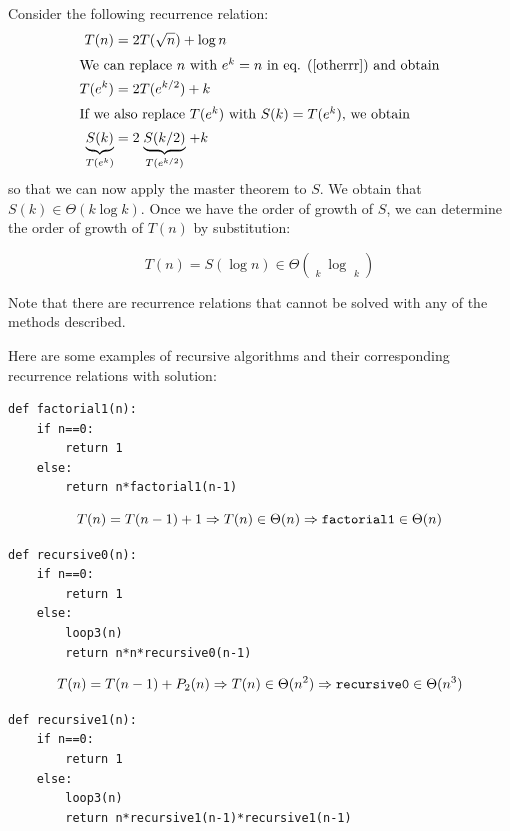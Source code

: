 \documentclass[justified,sixbynine]{tufte-book}
\def\stackunder#1#2{\mathrel{\mathop{#2}\limits_{#1}}}
\theoremstyle{plain}%
\theoremstyle{definition}
\theoremstyle{remark}
\begin{document}
\begin{fullwidth}
Consider the following recurrence relation:
\begin{align}
\label{otherrr}
T(n) &= 2T(\sqrt{n})+\log n \\
\intertext{We can replace $n$ with $e^k=n$ in eq. (\ref{otherrr}) and obtain}
T(e^k) &= 2T(e^{k/2})+k \\
\intertext{If we also replace $T(e^k)$ with $S(k)=T(e^k)$, we obtain}
\stackunder{T(e^k)}{\underbrace{S(k)}} &=
2\stackunder{T(e^{k/2})}{\underbrace{S(k/2)}}+k
\end{align}
so that we can now apply the master theorem to $S$. We obtain that $S(k)\in
\Theta (k\log k)$. Once we have the order of growth of $S$, we can determine
the order of growth of $T(n)$ by substitution:

\begin{equation}
T(n)=S(\log n)\in \Theta (\stackunder{k}{\underbrace{\log n}}\log
\stackunder{k}{\underbrace{\log n}})
\end{equation}

Note that there are recurrence relations that cannot be solved with any of
the methods described.

Here are some examples of recursive algorithms and their corresponding recurrence relations with solution:

\begin{lstlisting}
def factorial1(n):
    if n==0:
        return 1
    else:
        return n*factorial1(n-1)
\end{lstlisting}

\begin{equation}
T(n)=T(n-1)+1\Rightarrow T(n)\in \Theta (n)\Rightarrow \text{{\tt factorial1}%
}\in \Theta (n)
\end{equation}

\begin{lstlisting}
def recursive0(n):
    if n==0:
        return 1
    else:
        loop3(n)
        return n*n*recursive0(n-1)
\end{lstlisting}

\begin{equation}
T(n)=T(n-1)+P_2(n)\Rightarrow T(n)\in \Theta (n^2)\Rightarrow \text{{\tt %
recursive0}}\in \Theta (n^3)
\end{equation}

\begin{lstlisting}
def recursive1(n):
    if n==0:
        return 1
    else:
        loop3(n)
        return n*recursive1(n-1)*recursive1(n-1)
\end{lstlisting}


\end{fullwidth}
\end{document}

